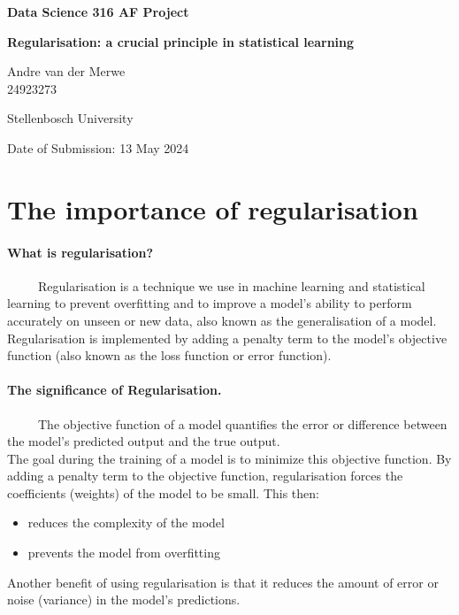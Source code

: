 \documentclass[12pt]{article}
\begin{document}
\begin{titlepage}
    \centering
    \vspace*{1cm} %
    {\Large\bfseries Data Science 316 AF Project\par}
    \vspace{2cm} %
    {\Large\textbf{Regularisation: a crucial principle in statistical learning}\par}
    \vspace{1cm} %
    {\large Andre van der Merwe \\ 24923273\par}

    \vfill %
    {\large Stellenbosch University\par}
    \vspace{0.5cm} %
    {\large Date of Submission: 13 May 2024\par}
\end{titlepage}

\newpage

\section*{The importance of regularisation}
\paragraph{What is regularisation?}~
\newline~
\newline~
Regularisation is a technique we use in machine learning and statistical learning to prevent overfitting and
to improve a model's ability to perform accurately on unseen or new data, also known as the generalisation of a model.
\\ Regularisation is implemented by adding a penalty term to the model's objective function (also known as the loss function or error function).

\paragraph{The significance of Regularisation.}~
\newline~
\newline~
The objective function of a model quantifies the error or difference between the model's predicted output and the true output.
\\ The goal during the training of a model is to minimize this objective function. By adding a penalty term to the objective function, regularisation forces the coefficients (weights) of the model to be small. This then:
\begin{itemize}
    \item reduces the complexity of the model
    \item prevents the model from overfitting 
\end{itemize}
Another benefit of using regularisation is that it reduces the amount of error or noise (variance) in the model's predictions. 
\end{document}
